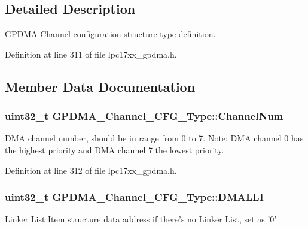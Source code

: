 \subsection{\-Detailed \-Description}
\-G\-P\-D\-M\-A \-Channel configuration structure type definition. 

\-Definition at line 311 of file lpc17xx\-\_\-gpdma.\-h.



\subsection{\-Member \-Data \-Documentation}
\hypertarget{struct_g_p_d_m_a___channel___c_f_g___type_a1ea2186835438ed661be2dd46e7f5658}{
\subsubsection[{\-Channel\-Num}]{\setlength{\rightskip}{0pt plus 5cm}uint32\-\_\-t {\bf \-G\-P\-D\-M\-A\-\_\-\-Channel\-\_\-\-C\-F\-G\-\_\-\-Type\-::\-Channel\-Num}}}\label{struct_g_p_d_m_a___channel___c_f_g___type_a1ea2186835438ed661be2dd46e7f5658}
\-D\-M\-A channel number, should be in range from 0 to 7. \-Note\-: \-D\-M\-A channel 0 has the highest priority and \-D\-M\-A channel 7 the lowest priority. 

\-Definition at line 312 of file lpc17xx\-\_\-gpdma.\-h.

\hypertarget{struct_g_p_d_m_a___channel___c_f_g___type_aadc8a728668610d303bca502add539b1}{
\subsubsection[{\-D\-M\-A\-L\-L\-I}]{\setlength{\rightskip}{0pt plus 5cm}uint32\-\_\-t {\bf \-G\-P\-D\-M\-A\-\_\-\-Channel\-\_\-\-C\-F\-G\-\_\-\-Type\-::\-D\-M\-A\-L\-L\-I}}}\label{struct_g_p_d_m_a___channel___c_f_g___type_aadc8a728668610d303bca502add539b1}
\-Linker \-List \-Item structure data address if there's no \-Linker \-List, set as '0' 

